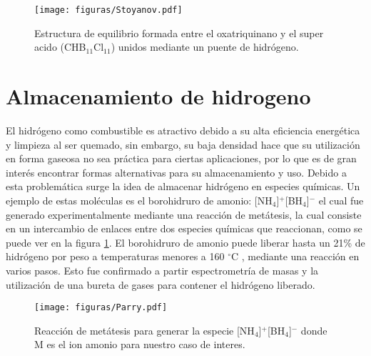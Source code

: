 \documentclass[12pt]{report}
\begin{document}
\begin{figure}[h]
\centering
\texttt{[image: figuras/Stoyanov.pdf]} 
\caption{Estructura de equilibrio formada entre el oxatriquinano y el super acido (CHB$_{11}$Cl$_{11}$) unidos mediante un puente de hidrógeno.\cite{Stoyanov2012}}
\end{figure}

\newpage
\section{Almacenamiento de hidrogeno }

El hidrógeno como combustible es atractivo debido a su alta eficiencia energética y limpieza al ser quemado, sin embargo, su baja densidad hace que su utilización en forma gaseosa no sea práctica para ciertas aplicaciones, por lo que es de gran interés encontrar formas alternativas para su almacenamiento y uso. Debido a esta problemática surge la idea de almacenar hidrógeno en especies químicas. Un ejemplo de estas moléculas es el borohidruro de amonio: [NH$_4$]$^+$[BH$_4$]$^-$\cite{Parry2002} el cual fue generado experimentalmente mediante una reacción de metátesis, la cual consiste en un intercambio de enlaces entre dos especies químicas que reaccionan, como se puede ver en la figura \ref{metatesis}.  El borohidruro de amonio puede liberar hasta un 21\% de hidrógeno por peso a temperaturas menores a 160    $^\circ$C \cite{Karkamar2009}, mediante una reacción en varios pasos. Esto fue confirmado a partir espectrometría de masas y la utilización de una bureta de gases para contener el hidrógeno liberado. 


\begin{figure}[h]
\centering
\texttt{[image: figuras/Parry.pdf]} 
\caption{Reacción de metátesis para generar la especie [NH$_4$]$^+$[BH$_4$]$^-$ donde M es el ion amonio para nuestro caso de interes.\cite{Parry2002}}
\label{metatesis}
\end{figure}
\end{document}
